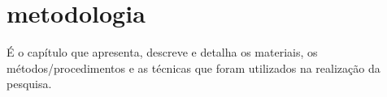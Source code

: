 \section{metodologia}
É o capítulo que apresenta, descreve e detalha os materiais, os métodos/procedimentos e as técnicas que foram utilizados na realização da pesquisa.